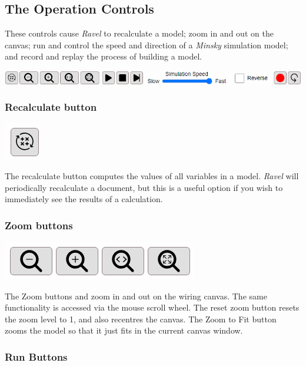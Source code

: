 \subsection{The Operation Controls}

These controls cause \emph{Ravel} to recalculate a model; zoom in
and out on the canvas; run and control the speed and direction of
a \emph{Minsky} simulation model; and record and replay the process
of building a model.

\includegraphics[width=15cm]{images/OperationsControls}

\subsubsection{Recalculate button}

\includegraphics{images/Recalc}

The recalculate button computes the values of all variables in a model.
\emph{Ravel} will periodically recalculate a document, but this is
a useful option if you wish to immediately see the results of a calculation.

\subsubsection{Zoom buttons}

\label{ZoomButtons}

\includegraphics{images/ZoomControls}

The Zoom buttons  and 
zoom in and out on the wiring canvas. The same functionality is
accessed via the mouse scroll wheel. The reset zoom button
 resets the zoom level to 1, and also
recentres the canvas. The Zoom to Fit button
 zooms the model so that it just fits in the
current canvas window.

\subsubsection{Run Buttons}

